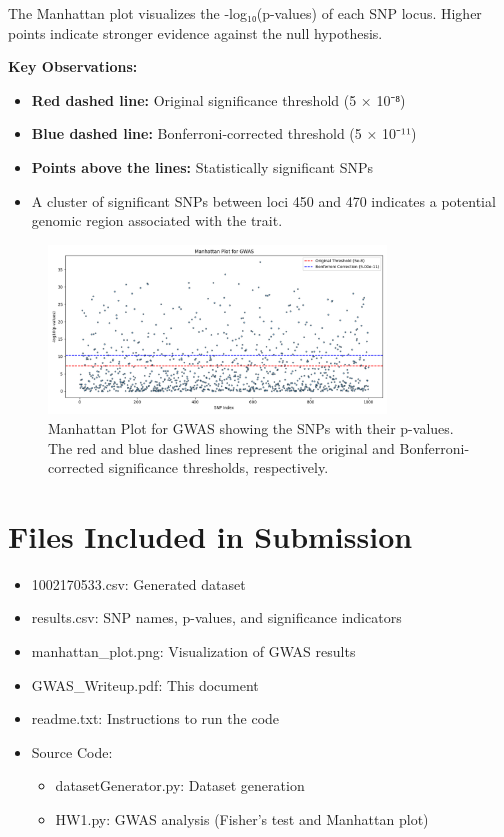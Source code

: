 \documentclass[12pt]{article}
\begin{document}
The Manhattan plot visualizes the -log₁₀(p-values) of each SNP locus. Higher points indicate stronger evidence against the null hypothesis.

\textbf{Key Observations:}
\begin{itemize}
  \item \textbf{Red dashed line:} Original significance threshold (5 × 10⁻⁸)
  \item \textbf{Blue dashed line:} Bonferroni-corrected threshold (5 × 10⁻¹¹)
  \item \textbf{Points above the lines:} Statistically significant SNPs
  \item A cluster of significant SNPs between loci 450 and 470 indicates a potential genomic region associated with the trait.
\end{itemize}

\begin{figure}[h!]
\centering
\includegraphics[width=0.8\textwidth]{manhattan_plot.png}
\caption{Manhattan Plot for GWAS showing the SNPs with their p-values. The red and blue dashed lines represent the original and Bonferroni-corrected significance thresholds, respectively.}
\end{figure}

\section*{Files Included in Submission}
\begin{itemize}
  \item 1002170533.csv: Generated dataset
  \item results.csv: SNP names, p-values, and significance indicators
  \item manhattan\_plot.png: Visualization of GWAS results
  \item GWAS\_Writeup.pdf: This document
  \item readme.txt: Instructions to run the code
  \item Source Code:
    \begin{itemize}
      \item datasetGenerator.py: Dataset generation
      \item HW1.py: GWAS analysis (Fisher's test and Manhattan plot)
    \end{itemize}
\end{itemize}
\end{document}
